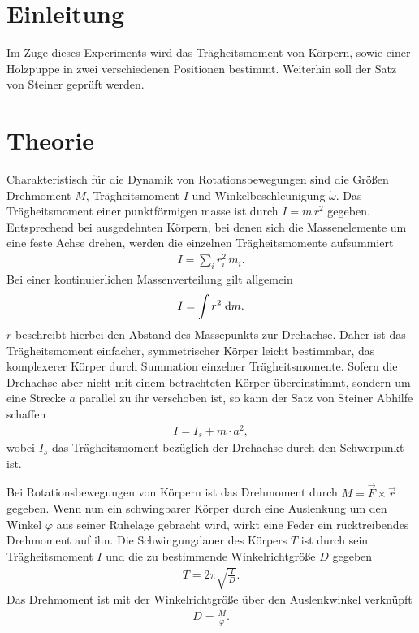 
\section{Einleitung}
Im Zuge dieses Experiments wird das Trägheitsmoment von Körpern, sowie einer Holzpuppe in zwei verschiedenen Positionen bestimmt. 
Weiterhin soll der Satz von Steiner geprüft werden.

\section{Theorie}
Charakteristisch für die Dynamik von Rotationsbewegungen sind die Größen Drehmoment $M$, Trägheitsmoment $I$ und Winkelbeschleunigung
$\dot \omega$. Das Trägheitsmoment einer punktförmigen masse ist durch $I = m\,r^2$ gegeben. Entsprechend bei ausgedehnten Körpern, bei
denen sich die Massenelemente um eine feste Achse drehen, werden die einzelnen Trägheitsmomente aufsummiert
\begin{align}
 I = \sum_i r^2_i\,m_i.
\end{align}
Bei einer kontinuierlichen Massenverteilung gilt allgemein
\begin{align}
 I = \int r^2 \; \mathrm{d} m.
\end{align}
$r$ beschreibt hierbei den Abstand des Massepunkts zur Drehachse. Daher ist das Trägheitsmoment einfacher, symmetrischer Körper leicht
bestimmbar, das komplexerer Körper durch Summation einzelner Trägheitsmomente. Sofern die Drehachse aber nicht mit einem betrachteten
Körper übereinstimmt, sondern um eine Strecke $a$ parallel zu ihr verschoben ist, so kann der Satz von Steiner Abhilfe schaffen
\begin{align}
 I = I_s + m \cdot a^2,
\end{align}
wobei $I_s$ das Trägheitsmoment bezüglich der Drehachse durch den Schwerpunkt ist. 

Bei Rotationsbewegungen von Körpern ist das Drehmoment durch $M = \vec{F} \times \vec{r}$ gegeben. Wenn nun ein schwingbarer Körper
durch eine Auslenkung um den Winkel $\varphi$ aus seiner Ruhelage gebracht wird, wirkt eine Feder ein rücktreibendes Drehmoment auf ihn.
Die Schwingungdauer des Körpers $T$ ist durch sein Trägheitsmoment $I$ und die zu bestimmende Winkelrichtgröße $D$ gegeben
\begin{align}
 T = 2\pi \sqrt{\frac{I}{D}}.
 \label{eq_periode}
\end{align}
Das Drehmoment ist mit der Winkelrichtgröße über den Auslenkwinkel verknüpft
\begin{align}
 D = \frac{M}{\varphi}.
 \label{eq_winkel}
\end{align}

